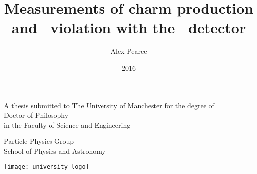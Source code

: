 \documentclass[a4paper,12pt]{memoir}
\author{Alex Pearce}
\title{%
  Measurements of charm production and
  \texorpdfstring{\CP}{CP}\ violation
  with the \lhcb\ detector
}
\date{2016}
\begin{document}
\frontmatter*

\makeatletter
\let\ps@cleared\ps@plain
\makeatother

\begin{titlingpage*}
  \begin{center}
    {\huge \textbf{\thetitle}\par}

    \vfill

    A thesis submitted to The University of Manchester for the degree of\\
    Doctor of Philosophy\\
    in the Faculty of Science and Engineering\\

    \vspace{0.8cm}

    \textbf{\thedate}

    \vfill

    \textbf{\theauthor}

    \vspace{0.8cm}

    Particle Physics Group\\
    School of Physics and Astronomy\\

    \vspace{0.8cm}

    \texttt{[image: university\_logo]}

    \iftoggle{draft}{%
      \vspace{0.8cm}
      \texttt{Draft generated on \today}
    }{}
  \end{center}
\end{titlingpage*}

\makeatletter
\let\ps@empty\ps@plain
\makeatother
\end{document}
